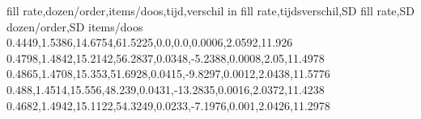 fill rate,dozen/order,items/doos,tijd,verschil in fill rate,tijdsverschil,SD fill rate,SD dozen/order,SD items/doos
0.4449,1.5386,14.6754,61.5225,0.0,0.0,0.0006,2.0592,11.926
0.4798,1.4842,15.2142,56.2837,0.0348,-5.2388,0.0008,2.05,11.4978
0.4865,1.4708,15.353,51.6928,0.0415,-9.8297,0.0012,2.0438,11.5776
0.488,1.4514,15.556,48.239,0.0431,-13.2835,0.0016,2.0372,11.4238
0.4682,1.4942,15.1122,54.3249,0.0233,-7.1976,0.001,2.0426,11.2978
